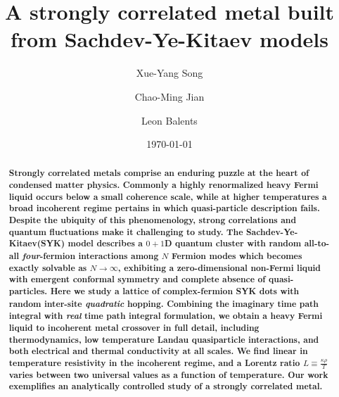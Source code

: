 \documentclass[twocolumn,floatfix,superscriptaddress]{revtex4-1}
\begin{document}
%
\title{A strongly correlated metal built from Sachdev-Ye-Kitaev models}
\author{Xue-Yang Song}
\author{Chao-Ming Jian}
\author{Leon Balents}

\begin{abstract}
  {\bf Strongly correlated metals comprise an enduring puzzle at the heart of condensed matter physics.  Commonly a highly renormalized heavy Fermi liquid occurs below a small coherence scale, while at higher temperatures a broad incoherent regime pertains in which quasi-particle description fails.  Despite the ubiquity of this phenomenology, strong correlations and quantum fluctuations make it challenging to study. The Sachdev-Ye-Kitaev(SYK) model describes a $0+1$D quantum cluster with random all-to-all \emph{four}-fermion interactions among $N$ Fermion modes which becomes exactly solvable as $N\rightarrow \infty$, exhibiting a zero-dimensional non-Fermi liquid with emergent conformal symmetry and complete absence of quasi-particles.  Here we study a lattice of complex-fermion SYK dots with random inter-site \emph{quadratic} hopping.  Combining the imaginary time path integral with \emph{real} time path integral formulation, we obtain a heavy Fermi liquid to incoherent metal crossover in full detail, including thermodynamics, low temperature Landau quasiparticle interactions, and both electrical and thermal conductivity at all scales.  We find linear in temperature resistivity in the incoherent regime, and a Lorentz ratio $L\equiv \frac{\kappa\rho}{T}$ varies between two universal values as a function of temperature. Our work exemplifies an analytically controlled study of a strongly correlated metal.}
\end{abstract}

\date{\today}

\maketitle
\end{document}
